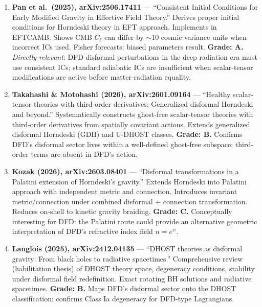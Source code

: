 \documentclass[11pt,a4paper]{article}
\begin{document}
\begin{enumerate}

\item \textbf{Pan et al.\ (2025), arXiv:2506.17411} --- ``Consistent Initial Conditions for Early Modified Gravity in Effective Field Theory.'' Derives proper initial conditions for Horndeski theory in EFT approach. Implements in EFTCAMB. Shows CMB $C_\ell$ can differ by $\sim$10 cosmic variance units when incorrect ICs used. Fisher forecasts: biased parameters result. \textbf{Grade: A.} \emph{Directly relevant}: DFD disformal perturbations in the deep radiation era must use consistent ICs; standard adiabatic ICs are insufficient when scalar-tensor modifications are active before matter-radiation equality.

\item \textbf{Takahashi \& Motohashi (2026), arXiv:2601.09164} --- ``Healthy scalar-tensor theories with third-order derivatives: Generalized disformal Horndeski and beyond.'' Systematically constructs ghost-free scalar-tensor theories with third-order derivatives from spatially covariant actions. Extends generalized disformal Horndeski (GDH) and U-DHOST classes. \textbf{Grade: B.} Confirms DFD's disformal sector lives within a well-defined ghost-free subspace; third-order terms are absent in DFD's action.

\item \textbf{Kozak (2026), arXiv:2603.08401} --- ``Disformal transformations in a Palatini extension of Horndeski's gravity.'' Extends Horndeski into Palatini approach with independent metric and connection. Introduces invariant metric/connection under combined disformal + connection transformation. Reduces on-shell to kinetic gravity braiding. \textbf{Grade: C.} Conceptually interesting for DFD: the Palatini route could provide an alternative geometric interpretation of DFD's refractive index field $n = e^\psi$.

\item \textbf{Langlois (2025), arXiv:2412.04135} --- ``DHOST theories as disformal gravity: From black holes to radiative spacetimes.'' Comprehensive review (habilitation thesis) of DHOST theory space, degeneracy conditions, stability under disformal field redefinition. Exact rotating BH solutions and radiative spacetimes. \textbf{Grade: B.} Maps DFD's disformal sector onto the DHOST classification; confirms Class Ia degeneracy for DFD-type Lagrangians.

\end{enumerate}
\end{document}

